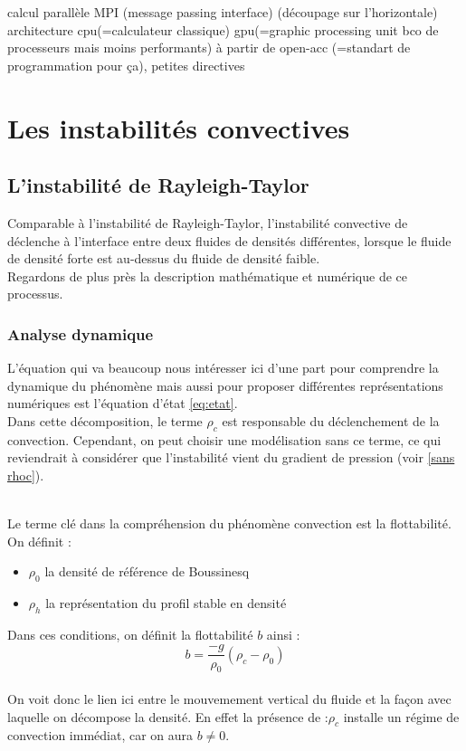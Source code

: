 \documentclass{rapportECC}
\begin{document}
calcul parallèle MPI (message passing interface) (découpage sur l'horizontale) \\
architecture cpu(=calculateur classique) gpu(=graphic processing unit bco de processeurs mais moins performants)  à partir de open-acc (=standart de programmation pour ça), petites directives\\


\section{Les instabilités convectives}
\subsection{L'instabilité de Rayleigh-Taylor}

Comparable à l'instabilité de Rayleigh-Taylor, l'instabilité convective de déclenche à l'interface entre deux fluides de densités différentes, lorsque le fluide de densité forte est au-dessus du fluide de densité faible. \\ 
Regardons de plus près la description mathématique et numérique de ce processus.

\subsubsection{Analyse dynamique}

L'équation qui va beaucoup nous intéresser ici d'une part pour comprendre la dynamique du phénomène mais aussi pour proposer différentes représentations numériques est l'équation d'état \eqref{eq:etat}. \\
\vspace{0.5 cm}
Dans cette décomposition, le terme $\rho_c$ est responsable du déclenchement de la convection. Cependant, on peut choisir une modélisation sans ce terme, ce qui reviendrait à considérer que l'instabilité vient du gradient de pression (voir \ref{sans rhoc}).

\\
\vspace{0.5 cm}
Le terme clé dans la compréhension du phénomène convection est la flottabilité. \\
On définit :
\begin{itemize}
    \item $\rho_0$ la densité de référence de Boussinesq
    \item $\rho_h$ la représentation du profil stable en densité
\end{itemize}
Dans ces conditions, on définit la flottabilité $b$ ainsi :
\begin{equation}
    b = \dfrac{-g}{\rho_0}(\rho_c - \rho_0)
\end{equation}
\\
On voit donc le lien ici entre le mouvemement vertical du fluide et la façon avec laquelle on décompose la densité. En effet la présence de :$\rho_c$ installe un régime de convection immédiat, car on aura $b \neq 0$.\\
\end{document}
